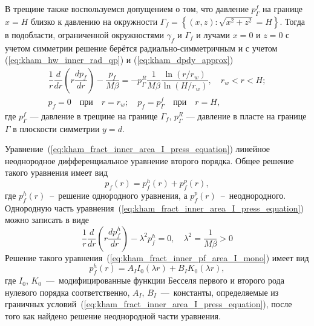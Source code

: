 \documentclass{article}
\newcommand{\mysub}[1]{%
  \par\vspace{0.5em}\noindent{\normalsize\underline{#1}}\par\vspace{0.5em}%
}
\begin{document}
\mysub{Подобласть (I) $r_w \leq r < H$}
В трещине также воспользуемся допущением о том, что давление $p^f_{\Gamma}$ на
границе $x=H$ близко к давлению на окружности $\Gamma_f=\left\{\left(x,z\right): \sqrt{x^2 + z^2} = H \right\}$. %
Тогда в подобласти, ограниченной окружностями $\gamma_f$ и $\Gamma_f$ и лучами $x=0$ и $z=0$
с учетом симметрии решение берётся радиально-симметричным и с учетом (\ref{eq:kham_hw_inner_rad_qp}) и (\ref{eq:kham_dpdy_approx})
\begin{equation}
	\displaystyle
	\begin{gathered}
		\dfrac{1}{r}\dfrac{d}{dr}\left(r\dfrac{d p_f}{dr}\right) - \dfrac{p_f}{M \beta} =
		- p^R_{\Gamma}\dfrac{1}{M \beta} \dfrac{\ln{\left(r/r_w\right)}}{\ln{\left(H/r_w\right)}}, \quad r_w < r < H;    \\[8pt]
		p_f = 0 \quad \text{при} \quad r = r_w; \quad p_f = p^f_{\Gamma} \quad \text{при} \quad r = H,
	\end{gathered}
	\label{eq:kham_fract_inner_area_I_press_equation}
\end{equation}
где $p^f_{\Gamma}$ — давление в трещине на границе $\Gamma_f$, $p^R_{\Gamma}$ — давление в
пласте на границе $\Gamma$ в плоскости симметрии $y=d$.

Уравнение~(\ref{eq:kham_fract_inner_area_I_press_equation}) линейное неоднородное дифференциальное уравнение второго порядка.
Общее решение такого уравнения имеет вид
\begin{equation}
	\displaystyle
	p_f(r) = p_f^h\left(r\right) + p_f^p\left(r\right),
	\label{eq:kham_common_final_pf_ode_solution_view}
\end{equation}
где $p_f^h\left(r\right)$~--~решение однородного уравнения, а $p_f^p\left(r\right)$~--~неоднородного.
Однородную часть уравнения~(\ref{eq:kham_fract_inner_area_I_press_equation}) можно записать в виде
\begin{equation}
	\displaystyle
	\dfrac{1}{r}\dfrac{d}{dr}\left(r\dfrac{d p_f^h}{dr}\right) - \lambda^2 p_f^h = 0, \quad \lambda^2 = \dfrac{1}{M \beta} > 0
	\label{eq:kham_fract_inner_pf_area_I_mono}
\end{equation}
Решение такого уравнения~(\ref{eq:kham_fract_inner_pf_area_I_mono}) имеет вид
\begin{equation}
	\displaystyle
	p_f^h\left(r\right) = A_I I_0\left(\lambda r\right) + B_I K_0\left(\lambda r\right),
	\label{eq:kham_common_fa2_press_uniform_solution_main}
\end{equation}
где $I_0$, $K_0$~---~модифицированные функции Бесселя первого и второго рода нулевого порядка соответственно,
$A_I$, $B_I$~---~константы, определяемые из граничных условий~(\ref{eq:kham_fract_inner_area_I_press_equation}),
после того как найдено решение неоднородной части уравнения.
\end{document}
